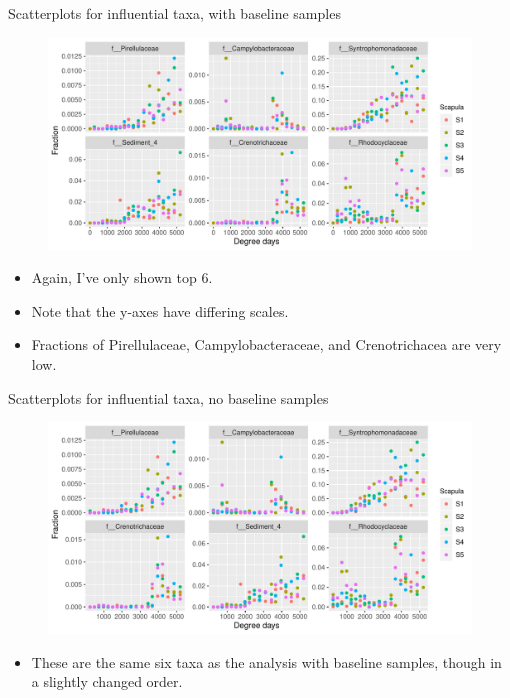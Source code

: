 \documentclass{beamer}
\begin{document}
\begin{frame}{Scatterplots for influential taxa, with baseline samples}

  \begin{center}
    \begin{figure}
      \includegraphics[width=4.75in]{HenleyLake/bacteria/use_families/w_scapulae/w_baseline/infl_scapula_family_scatter}
    \end{figure}
  \end{center}
  \vspace{-0.25in}
  {\scriptsize
  \begin{itemize}
  \item Again, I've only shown top 6.
  \item Note that the y-axes have differing scales.
  \item Fractions of Pirellulaceae, Campylobacteraceae, and Crenotrichacea
  are very low.
  \end{itemize}
  }

\end{frame}



\begin{frame}{Scatterplots for influential taxa, no baseline samples}

  \begin{center}
    \begin{figure}
      \includegraphics[width=4.75in]{HenleyLake/bacteria/use_families/w_scapulae/no_baseline/infl_scapula_family_no_baseline_scatter}
    \end{figure}
  \end{center}
  \vspace{-0.25in}
  {\scriptsize
  \begin{itemize}
  \item These are the same six taxa as the analysis with baseline samples, though in a slightly changed order.
  \end{itemize}
  }

\end{frame}
\end{document}
